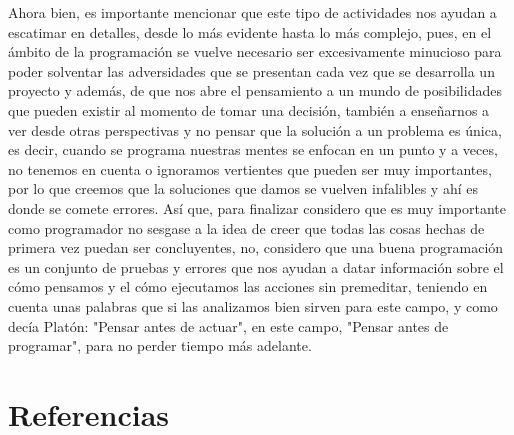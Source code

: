 \documentclass{article}
\begin{document}
Ahora bien, es importante mencionar que este tipo de actividades nos ayudan a escatimar en detalles, desde lo más evidente hasta lo más complejo, pues, en el ámbito de la programación se vuelve necesario ser excesivamente minucioso para poder solventar las adversidades que se presentan cada vez que se desarrolla un proyecto y además, de que nos abre el pensamiento a un mundo de posibilidades que pueden existir al momento de tomar una decisión, también a enseñarnos a ver desde otras perspectivas y no pensar que la solución a un problema es única, es decir, cuando se programa nuestras mentes se enfocan en un punto y a veces, no tenemos en cuenta o ignoramos vertientes que pueden ser muy importantes, por lo que creemos que la soluciones que damos se vuelven infalibles y ahí es donde se comete errores. Así que, para finalizar considero que es muy importante como programador no sesgase a la idea de creer que todas las cosas hechas de primera vez puedan ser concluyentes, no, considero que una buena programación es un conjunto de pruebas y errores que nos ayudan a datar información sobre el cómo pensamos y el cómo ejecutamos las acciones sin premeditar, teniendo en cuenta unas palabras que si las analizamos bien sirven para este campo, y como decía Platón: "Pensar antes de actuar", en este campo, "Pensar antes de programar", para no perder tiempo más adelante.

\newpage
\section{Referencias}


\cite{calistenia}
\end{document}
